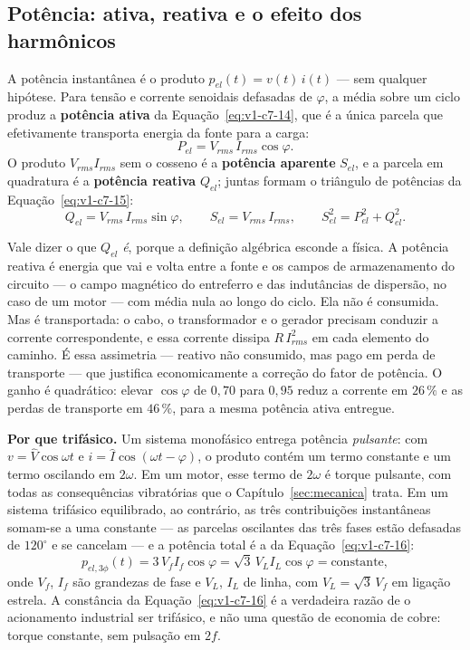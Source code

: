 \documentclass[12pt,a4paper]{article}
\numberwithin{equation}{section}
\numberwithin{table}{section}
\numberwithin{figure}{section}
\begin{document}
\subsection{Potência: ativa, reativa e o efeito dos
harmônicos}\label{sub:v1-c7-potencia}

A potência instantânea é o produto $p_{el}(t) = v(t)\,i(t)$ --- sem qualquer
hipótese. Para tensão e corrente senoidais defasadas de $\varphi$, a média
sobre um ciclo produz a \textbf{potência ativa} da
Equação~\eqref{eq:v1-c7-14}, que é a única parcela que efetivamente transporta
energia da fonte para a carga:
\begin{equation}\label{eq:v1-c7-14}
P_{el} = V_{rms}\,I_{rms}\cos\varphi .
\end{equation}
O produto $V_{rms}I_{rms}$ sem o cosseno é a \textbf{potência aparente}
$S_{el}$, e a parcela em quadratura é a \textbf{potência reativa} $Q_{el}$;
juntas formam o triângulo de potências da Equação~\eqref{eq:v1-c7-15}:
\begin{equation}\label{eq:v1-c7-15}
Q_{el} = V_{rms}\,I_{rms}\sin\varphi,
\qquad
S_{el} = V_{rms}\,I_{rms},
\qquad
S_{el}^{2} = P_{el}^{2} + Q_{el}^{2} .
\end{equation}

Vale dizer o que $Q_{el}$ \emph{é}, porque a definição algébrica esconde a
física. A potência reativa é energia que vai e volta entre a fonte e os campos
de armazenamento do circuito --- o campo magnético do entreferro e das
indutâncias de dispersão, no caso de um motor --- com média nula ao longo do
ciclo. Ela não é consumida. Mas é transportada: o cabo, o transformador e o
gerador precisam conduzir a corrente correspondente, e essa corrente dissipa
$R\,I_{rms}^2$ em cada elemento do caminho. É essa assimetria --- reativo não
consumido, mas pago em perda de transporte --- que justifica economicamente a
correção do fator de potência. O ganho é quadrático: elevar $\cos\varphi$ de
$0{,}70$ para $0{,}95$ reduz a corrente em $26\,\%$ e as perdas de transporte
em $46\,\%$, para a mesma potência ativa entregue.

\textbf{Por que trifásico.} Um sistema monofásico entrega potência
\emph{pulsante}: com $v = \hat{V}\cos\omega t$ e
$i = \hat{I}\cos(\omega t - \varphi)$, o produto contém um termo constante e um
termo oscilando em $2\omega$. Em um motor, esse termo de $2\omega$ é torque
pulsante, com todas as consequências vibratórias que o
Capítulo~\ref{sec:mecanica} trata. Em um sistema trifásico equilibrado, ao
contrário, as três contribuições instantâneas somam-se a uma constante --- as
parcelas oscilantes das três fases estão defasadas de $120^{\circ}$ e se
cancelam --- e a potência total é a da Equação~\eqref{eq:v1-c7-16}:
\begin{equation}\label{eq:v1-c7-16}
p_{el,3\phi}(t) = 3\,V_{f}I_{f}\cos\varphi = \sqrt{3}\,V_L I_L\cos\varphi
= \text{constante},
\end{equation}
onde $V_f$, $I_f$ são grandezas de fase e $V_L$, $I_L$ de linha, com
$V_L = \sqrt{3}\,V_f$ em ligação estrela. A constância da
Equação~\eqref{eq:v1-c7-16} é a verdadeira razão de o acionamento industrial
ser trifásico, e não uma questão de economia de cobre: torque constante, sem
pulsação em $2f$.
\end{document}

